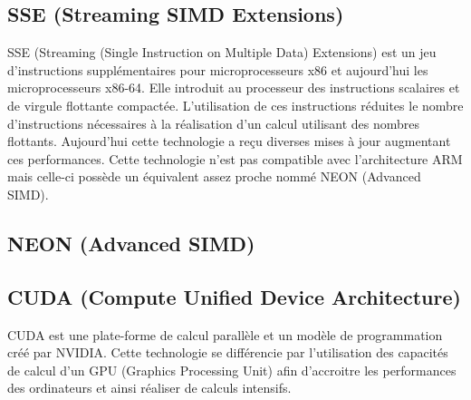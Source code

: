 \subsection{ SSE (Streaming SIMD Extensions) }

SSE (Streaming (Single Instruction on Multiple Data) Extensions) est un jeu d'instructions supplémentaires pour microprocesseurs x86 et aujourd'hui les microprocesseurs x86-64. Elle introduit au processeur des instructions scalaires et de virgule flottante compactée. L'utilisation de ces instructions réduites le nombre d'instructions nécessaires à la réalisation d'un calcul utilisant des nombres flottants. Aujourd'hui cette technologie a reçu diverses mises à jour augmentant ces performances. Cette technologie n'est pas compatible avec l'architecture ARM mais celle-ci possède un équivalent assez proche nommé NEON (Advanced SIMD). 

\subsection{ NEON (Advanced SIMD) }





\subsection{ CUDA (Compute Unified Device Architecture) }

CUDA est une plate-forme de calcul parallèle et un modèle de programmation créé par NVIDIA. Cette technologie se différencie par l'utilisation des capacités de calcul d'un GPU (Graphics Processing Unit) afin d'accroitre les performances des ordinateurs et ainsi réaliser de calculs intensifs.    

 




 



